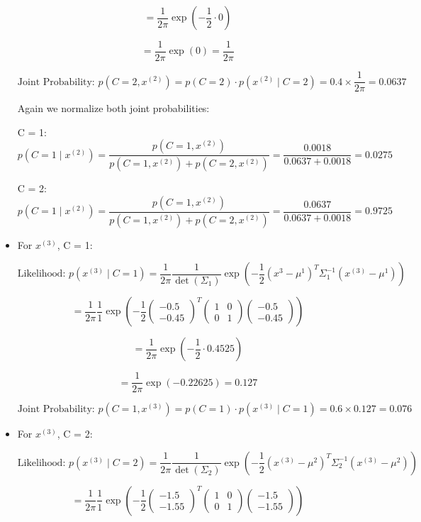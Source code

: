 \documentclass{article}
\begin{document}
\begin{itemize}
\[
= \frac{1}{2\pi} \exp \left( -\frac{1}{2} \cdot 0 \right) 
\]

\[
= \frac{1}{2\pi} \exp(0) = \frac{1}{2\pi}
\]

\[
\text{Joint Probability: } p(C = 2, x^{(2)}) = p(C = 2) \cdot p(x^{(2)} \mid C = 2) = 0.4 \times \frac{1}{2\pi} = 0.0637
\]

Again we normalize both joint probabilities:

C = 1:
\[
p(C = 1 \mid x^{(2)}) = \frac{p(C = 1, x^{(2)})}{p(C = 1, x^{(2)}) + p(C = 2, x^{(2)})} = \frac{0.0018}{0.0637 + 0.0018} = 0.0275
\]

C = 2:
\[
p(C = 1 \mid x^{(2)}) = \frac{p(C = 1, x^{(2)})}{p(C = 1, x^{(2)}) + p(C = 2, x^{(2)})} = \frac{0.0637}{0.0637 + 0.0018} = 0.9725
\]

 \item[\textbullet] For \( x^{(3)} \), C = 1: 

\[
\text{Likelihood: } p \left( x^{(3)} \mid C = 1 \right) = \frac{1}{2\pi} \frac{1}{\det(\Sigma_1)} \exp \left( -\frac{1}{2} \left( x^{3} - \mu^1 \right)^T \Sigma_1^{-1} \left( x^{(3)} - \mu^1 \right) \right)
\]

\[
= \frac{1}{2\pi} \frac{1}{1} \exp \left( -\frac{1}{2} \begin{pmatrix} -0.5 \\ -0.45 \end{pmatrix}^T \begin{pmatrix} 1 & 0 \\ 0 & 1 \end{pmatrix} \begin{pmatrix} -0.5 \\ -0.45 \end{pmatrix} \right)
\]

\[
= \frac{1}{2\pi} \exp \left( -\frac{1}{2} \cdot 0.4525 \right) 
\]

\[
= \frac{1}{2\pi} \exp(-0.22625) = 0.127
\]

\[
\text{Joint Probability: } p(C = 1, x^{(3)}) = p(C = 1) \cdot p(x^{(3)} \mid C = 1) = 0.6 \times 0.127 = 0.076
\]

 \item[\textbullet] For \( x^{(3)} \), C = 2: 

\[
\text{Likelihood: } p \left( x^{(3)} \mid C = 2 \right) = \frac{1}{2\pi} \frac{1}{\det(\Sigma_2)} \exp \left( -\frac{1}{2} \left( x^{(3)} - \mu^2 \right)^T \Sigma_2^{-1} \left( x^{(3)} - \mu^2 \right) \right)
\]

\[
= \frac{1}{2\pi} \frac{1}{1} \exp \left( -\frac{1}{2} \begin{pmatrix} -1.5 \\ -1.55 \end{pmatrix}^T \begin{pmatrix} 1 & 0 \\ 0 & 1 \end{pmatrix} \begin{pmatrix} -1.5 \\ -1.55 \end{pmatrix} \right)
\]


\end{itemize}
\end{document}
